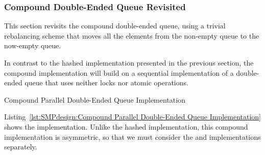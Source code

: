 \subsubsection{Compound Double-Ended Queue Revisited}
\label{sec:SMPdesign:Compound Double-Ended Queue Revisited}

This section revisits the compound double-ended queue, using a trivial
rebalancing scheme that moves all the elements from the non-empty
queue to the now-empty queue.

\QuickQuizEnd

In contrast to the hashed implementation presented in
the previous section, the compound implementation will build on
a sequential implementation of a double-ended queue that uses
neither locks nor atomic operations.

\begin{listing}[tbp]

\caption{Compound Parallel Double-Ended Queue Implementation}
\label{lst:SMPdesign:Compound Parallel Double-Ended Queue Implementation}
\end{listing}

Listing~\ref{lst:SMPdesign:Compound Parallel Double-Ended Queue Implementation}
shows the implementation.
Unlike the hashed implementation, this compound implementation is
asymmetric, so that we must consider the 
and  implementations separately.

\QuickQuizEnd

